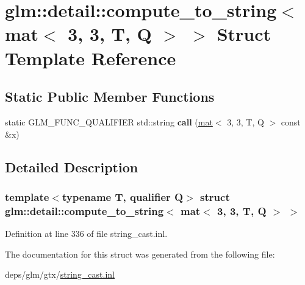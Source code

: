 \hypertarget{structglm_1_1detail_1_1compute__to__string_3_01mat_3_013_00_013_00_01T_00_01Q_01_4_01_4}{}\section{glm\+:\+:detail\+:\+:compute\+\_\+to\+\_\+string$<$ mat$<$ 3, 3, T, Q $>$ $>$ Struct Template Reference}
\label{structglm_1_1detail_1_1compute__to__string_3_01mat_3_013_00_013_00_01T_00_01Q_01_4_01_4}
\subsection*{Static Public Member Functions}
\begin{DoxyCompactItemize}
\item 
\mbox{\label{structglm_1_1detail_1_1compute__to__string_3_01mat_3_013_00_013_00_01T_00_01Q_01_4_01_4_aebf52cc023615d49c480e8cde7cda457}} 
static G\+L\+M\+\_\+\+F\+U\+N\+C\+\_\+\+Q\+U\+A\+L\+I\+F\+I\+ER std\+::string {\bfseries call} (\hyperlink{structglm_1_1mat}{mat}$<$ 3, 3, T, Q $>$ const \&x)
\end{DoxyCompactItemize}


\subsection{Detailed Description}
\subsubsection*{template$<$typename T, qualifier Q$>$\newline
struct glm\+::detail\+::compute\+\_\+to\+\_\+string$<$ mat$<$ 3, 3, T, Q $>$ $>$}



Definition at line 336 of file string\+\_\+cast.\+inl.



The documentation for this struct was generated from the following file\+:\begin{DoxyCompactItemize}
\item 
deps/glm/gtx/\hyperlink{string__cast_8inl}{string\+\_\+cast.\+inl}\end{DoxyCompactItemize}

